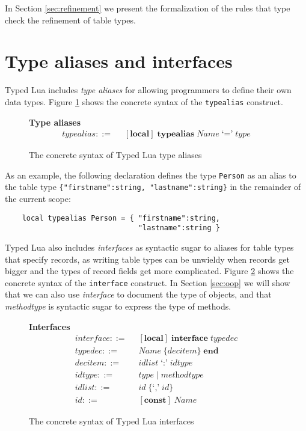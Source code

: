 In Section \ref{sec:refinement} we present the formalization of the
rules that type check the refinement of table types.

\section{Type aliases and interfaces}
\label{sec:alias}

Typed Lua includes \emph{type aliases} for allowing programmers to
define their own data types.
Figure \ref{fig:aliases} shows the concrete syntax of the
\texttt{typealias} construct.

\begin{figure}[!ht]
\textbf{Type aliases}\\
\dstart
\begin{align*}
\textit{typealias} ::= & \;\; [\textbf{local}] \; \textbf{typealias} \; \textit{Name} \; \texttt{`='} \; \textit{type}
\end{align*}
\dend
\caption{The concrete syntax of Typed Lua type aliases}
\label{fig:aliases}
\end{figure}

As an example, the following declaration defines the type \texttt{Person}
as an alias to the table type \texttt{\{"firstname":string, "lastname":string\}}
in the remainder of the current scope:
\begin{verbatim}
    local typealias Person = { "firstname":string,
                               "lastname":string }
\end{verbatim}

Typed Lua also includes \emph{interfaces} as syntactic sugar to aliases
for table types that specify records, as writing table types can be unwieldy
when records get bigger and the types of record fields get more complicated.
Figure \ref{fig:interfaces} shows the concrete syntax of the
\texttt{interface} construct.
In Section \ref{sec:oop} we will show that we can also use \emph{interface} to
document the type of objects, and that \emph{methodtype} is syntactic
sugar to express the type of methods.

\begin{figure}[!ht]
\textbf{Interfaces}\\
\dstart
\begin{align*}
\textit{interface} ::= & \;\; [\textbf{local}] \; \textbf{interface} \; \textit{typedec}\\
\textit{typedec} ::= & \;\; \textit{Name} \; \{\textit{decitem}\} \; \textbf{end}\\
\textit{decitem} ::= & \;\; \textit{idlist} \; \texttt{`:'} \; \textit{idtype}\\
\textit{idtype} ::= & \;\; \textit{type} \; | \; \textit{methodtype}\\
\textit{idlist} ::= & \;\; \textit{id} \; \{\texttt{`,'} \; \textit{id}\}\\
\textit{id} ::= & \;\; [\textbf{const}] \; \textit{Name}
\end{align*}
\dend
\caption{The concrete syntax of Typed Lua interfaces}
\label{fig:interfaces}
\end{figure}

